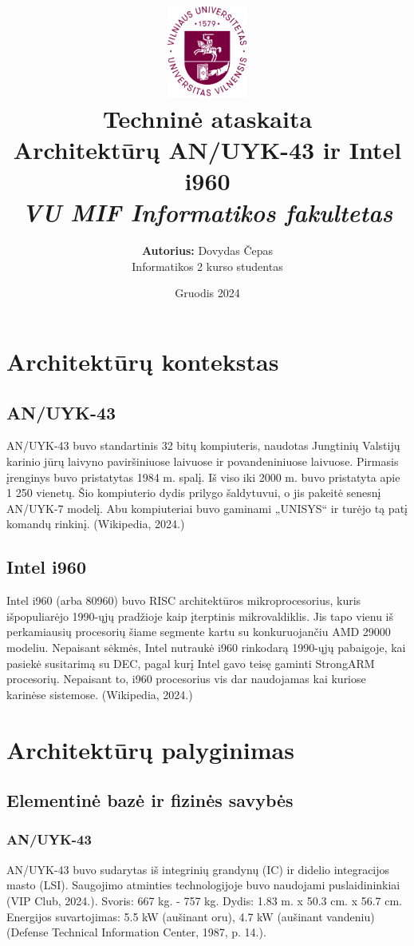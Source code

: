 \documentclass{article}
\title{
    \vspace{1cm}
    \includegraphics[width=0.2\textwidth]{VU-logotype.png} \\[2cm] 
    \Huge \textbf{Techninė ataskaita} \\[0.5cm]
    \LARGE \textbf{Architektūrų AN/UYK-43 ir Intel i960} \\[0.5cm]
    \normalsize \textit{VU MIF Informatikos fakultetas}
}
\author{
    \textbf{Autorius:} Dovydas Čepas \\
    Informatikos 2 kurso studentas
}
\date{\large Gruodis 2024}
\begin{document}
\begin{titlepage}
    \maketitle
    \vfill
\end{titlepage}
\section{Architektūrų kontekstas}
\subsection{AN/UYK-43}
AN/UYK-43 buvo standartinis 32 bitų kompiuteris, naudotas Jungtinių Valstijų karinio jūrų laivyno paviršiniuose laivuose ir povandeniniuose laivuose. Pirmasis įrenginys buvo pristatytas 1984 m. spalį. Iš viso iki 2000 m. buvo pristatyta apie 1 250 vienetų. Šio kompiuterio dydis prilygo šaldytuvui, o jis pakeitė senesnį AN/UYK-7 modelį. Abu kompiuteriai buvo gaminami „UNISYS“ ir turėjo tą patį komandų rinkinį. (Wikipedia, 2024.)
\subsection{Intel i960}
Intel i960 (arba 80960) buvo RISC architektūros mikroprocesorius, kuris išpopuliarėjo 1990-ųjų pradžioje kaip įterptinis mikrovaldiklis. Jis tapo vienu iš perkamiausių procesorių šiame segmente kartu su konkuruojančiu AMD 29000 modeliu. Nepaisant sėkmės, Intel nutraukė i960 rinkodarą 1990-ųjų pabaigoje, kai pasiekė susitarimą su DEC, pagal kurį Intel gavo teisę gaminti StrongARM procesorių. Nepaisant to, i960 procesorius vis dar naudojamas kai kuriose karinėse sistemose. (Wikipedia, 2024.)
\section{Architektūrų palyginimas}
\subsection{Elementinė bazė ir fizinės savybės}
\subsubsection{AN/UYK-43}
AN/UYK-43 buvo sudarytas iš integrinių grandynų (IC) ir didelio integracijos masto (LSI). Saugojimo atminties technologijoje buvo naudojami puslaidininkiai (VIP Club, 2024.). Svoris: 667 kg. - 757 kg. Dydis: 1.83 m. x 50.3 cm. x 56.7 cm. Energijos suvartojimas: 5.5 kW (aušinant oru), 4.7 kW (aušinant vandeniu) (Defense Technical Information Center, 1987, p. 14.).
\end{document}
